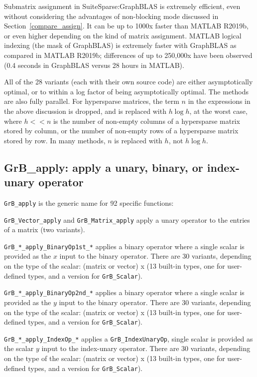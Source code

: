 \documentclass[12pt]{article}
\newenvironment{packed_itemize}{
\begin{itemize}
  \setlength{\itemsep}{1pt}
  \setlength{\parskip}{0pt}
  \setlength{\parsep}{0pt}
}{\end{itemize}}
\begin{document}

Submatrix assignment in SuiteSparse:GraphBLAS is extremely efficient, even
without considering the advantages of non-blocking mode discussed in
Section~\ref{compare_assign}.  It can be up to 1000x faster than MATLAB R2019b,
or even higher depending on the kind of matrix assignment.  MATLAB logical
indexing (the mask of GraphBLAS) is extremely faster with GraphBLAS as compared
in MATLAB R2019b; differences of up to 250,000x have been observed (0.4 seconds
in GraphBLAS versus 28 hours in MATLAB).

All of the 28 variants (each with their own source code) are either
asymptotically optimal, or to within a log factor of being asymptotically
optimal.  The methods are also fully parallel.  For hypersparse matrices, the
term $n$ in the expressions in the above discussion is dropped, and is replaced
with $h \log h$, at the worst case, where $h << n$ is the number of non-empty
columns of a hypersparse matrix stored by column, or the number of non-empty
rows of a hypersparse matrix stored by row.  In many methods, $n$ is replaced
with $h$, not $h \log h$.

\newpage
\subsection{{\sf GrB\_apply:} apply a unary, binary, or index-unary operator}
\label{apply}

\verb'GrB_apply' is the generic name for 92 specific functions:

\begin{packed_itemize}
\item
\verb'GrB_Vector_apply' and \verb'GrB_Matrix_apply' apply a unary operator to
the entries of a matrix (two variants).

\item \verb'GrB_*_apply_BinaryOp1st_*' applies a binary
operator where a single scalar is provided as the $x$ input to the binary
operator.
There are 30 variants, depending on the type of the scalar: (matrix or vector)
x (13 built-in types, one for user-defined types, and a version for
\verb'GrB_Scalar').

\item \verb'GrB_*_apply_BinaryOp2nd_*' applies a binary operator where a
single scalar is provided as the $y$ input to the binary operator.
There are 30 variants, depending on the type of the scalar: (matrix or vector)
x (13 built-in types, one for user-defined types, and a version for
\verb'GrB_Scalar').

\item \verb'GrB_*_apply_IndexOp_*' applies a \verb'GrB_IndexUnaryOp',
single scalar is provided as the scalar $y$ input to the index-unary operator.
There are 30 variants, depending on the type of the scalar: (matrix or vector)
x (13 built-in types, one for user-defined types, and a version for
\verb'GrB_Scalar').

\end{packed_itemize}
\end{document}
